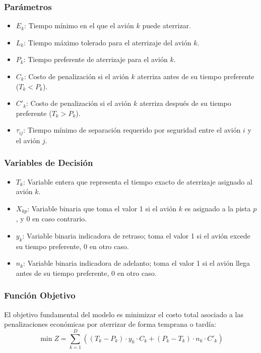 \documentclass[12pt]{article}
\begin{document}
\subsubsection{Parámetros}
\begin{itemize}
    \item $E_k$: Tiempo mínimo en el que el avión $k$ puede aterrizar.
    \item $L_k$: Tiempo máximo tolerado para el aterrizaje del avión $k$.
    \item $P_k$: Tiempo preferente de aterrizaje para el avión $k$.
    \item $C_k$: Costo de penalización si el avión $k$ aterriza antes de su tiempo preferente ($T_k < P_k$).
    \item $C'_k$: Costo de penalización si el avión $k$ aterriza después de su tiempo preferente ($T_k > P_k$).
    \item $\tau_{ij}$: Tiempo mínimo de separación requerido por seguridad entre el avión $i$ y el avión $j$.
\end{itemize}

\subsubsection{Variables de Decisión}
\begin{itemize}
    \item $T_k$: Variable entera que representa el tiempo exacto de aterrizaje asignado al avión $k$.
    \item $X_{kp}$: Variable binaria que toma el valor 1 si el avión $k$ es asignado a la pista $p$, y 0 en caso contrario.
    \item $y_k$: Variable binaria indicadora de retraso; toma el valor 1 si el avión excede su tiempo preferente, 0 en otro caso.
    \item $n_k$: Variable binaria indicadora de adelanto; toma el valor 1 si el avión llega antes de su tiempo preferente, 0 en otro caso.
\end{itemize}

\subsubsection{Función Objetivo}
El objetivo fundamental del modelo es minimizar el costo total asociado a las penalizaciones económicas por aterrizar de forma temprana o tardía:
$$ \min Z = \sum_{k=1}^{D} \left( (T_k - P_k) \cdot y_k \cdot C_k + (P_k - T_k) \cdot n_k \cdot C'_k \right) $$
\end{document}
